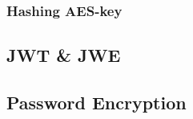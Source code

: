\subsubsection{Hashing AES-key}\label{subsubsec:hashing-aes-key}


\subsection{JWT \& JWE}\label{subsec:jwt}

\subsection{Password Encryption}\label{subsec:password-encryption}


%





